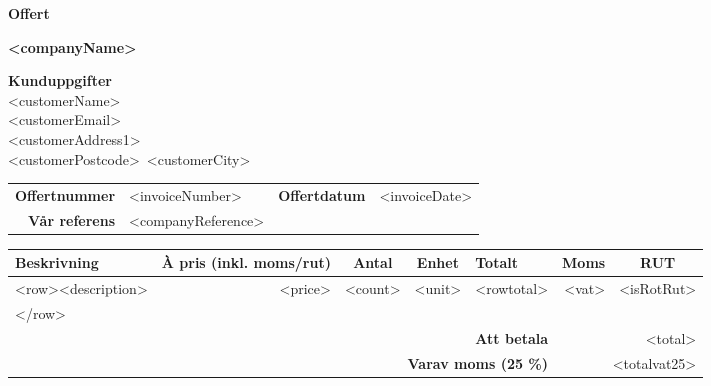 \documentclass[a4paper,11pt]{extarticle}
\newcommand{\changefont}{%
        \fontsize{9}{11}\selectfont
    }
\begin{document}
\pagestyle{fancy}
\fancyhf{} %
\renewcommand{\headrulewidth}{0pt}
\renewcommand{\footrulewidth}{0pt}

\setlength{\fboxsep}{1.5em}
\setlength{\parindent}{0pt}

\begin{minipage}[b]{0.4\textwidth}
\raggedright
{\color{Primary}
\fontsize{36}{0}\selectfont
\textbf{Offert}}
\end{minipage}%
\begin{minipage}[b]{0.6\textwidth}
\raggedleft
{\color{Secondary}
\fontsize{36}{0}\selectfont
\textbf{<companyName>}}
\end{minipage}

\vspace{2em}
\begin{minipage}[t]{0.3\textwidth}
\textbf{Kunduppgifter} \\
<customerName>\\
<customerEmail>\\
<customerAddress1>\\
<customerPostcode>~<customerCity>\\
\end{minipage}

\renewcommand\arraystretch{1.5}
\begin{tabular*}{\linewidth}{rlrl}
\hline
    \textbf{Offertnummer} & <invoiceNumber> & \textbf{Offertdatum} & <invoiceDate> \\
    \textbf{Vår referens} & <companyReference> & &\\
\hline
\end{tabular*}

\begin{tabularx}{\textwidth}{Xrrrrrc}
\rowcolor{Gray}
\changefont \textbf{Beskrivning} &
\multicolumn{1}{l}{\changefont \textbf{À pris (inkl. moms/rut)}} &
\multicolumn{1}{c}{\changefont \textbf{Antal}} &
\multicolumn{1}{c}{\changefont \textbf{Enhet}} &
\multicolumn{1}{l}{\changefont \textbf{Totalt}} &
\multicolumn{1}{c}{\changefont \textbf{Moms}} &
\changefont \textbf{RUT}\\
\hline
    <row><description> & <price> & <count> & <unit> & <rowtotal> & <vat> & <isRotRut>\\
    </row>
    & & & & & & \\
\hline
    \multicolumn{5}{r}{\textbf{Att betala}} & \multicolumn{2}{r}{<total>} \\
    \multicolumn{5}{r}{\textbf{Varav moms (25 \%)}} & \multicolumn{2}{r}{<totalvat25>} \\
\hline
\end{tabularx}
\end{document}
